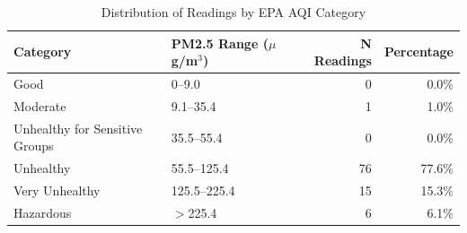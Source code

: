 \begin{table}[htbp]
\centering
\caption{Distribution of Readings by EPA AQI Category}
\label{tab:categories}
\begin{tabular}{llrr}
\toprule
Category & PM2.5 Range ($\mu$g/m$^3$) & N Readings & Percentage \\
\midrule
Good & 0--9.0 & 0 & 0.0\% \\
Moderate & 9.1--35.4 & 1 & 1.0\% \\
Unhealthy for Sensitive Groups & 35.5--55.4 & 0 & 0.0\% \\
Unhealthy & 55.5--125.4 & 76 & 77.6\% \\
Very Unhealthy & 125.5--225.4 & 15 & 15.3\% \\
Hazardous & $>$225.4 & 6 & 6.1\% \\
\bottomrule
\end{tabular}
\end{table}
